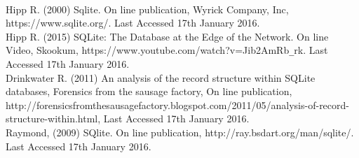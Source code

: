 \begin{thebibliography}{0}
\\
Hipp R. (2000) Sqlite. On line publication, Wyrick Company, Inc, https://www.sqlite.org/. Last Accessed 17th January 2016.
\\
Hipp R. (2015) SQLite: The Database at the Edge of the Network. On line Video, Skookum, https://www.youtube.com/watch?v=Jib2AmRb\verb|_|rk. Last Accessed 17th January 2016.
\\
Drinkwater R. (2011) An analysis of the record structure within SQLite databases, Forensics from the sausage factory, On line publication, http://forensicsfromthesausagefactory.blogspot.com/2011/05/analysis-of-record- \newline structure-within.html, Last Accessed 17th January 2016.
\\
Raymond, (2009) SQlite.  On line publication, http://ray.bsdart.org/man/sqlite/. Last Accessed 17th January 2016.

\end{thebibliography}